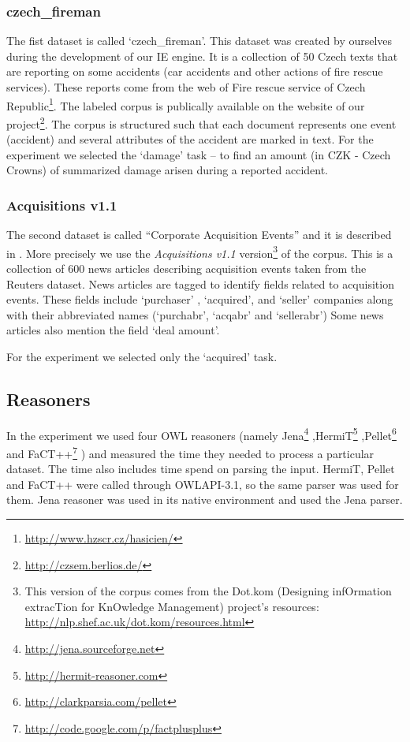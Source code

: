 \subsubsection{czech\_fireman}


The fist dataset is called `czech\_fireman'. This dataset was created by ourselves during the development of our IE  engine. It is a collection of 50 Czech texts that are reporting on some accidents (car accidents and other actions of fire rescue services). These reports come from the web of Fire rescue service of Czech Republic\footnote{\url{http://www.hzscr.cz/hasicien/}}. The labeled corpus is publically available on the website of our project\footnote{\url{http://czsem.berlios.de/}}.
The corpus is structured such that each document represents one event (accident) and several attributes of the accident are marked in text. For the experiment we selected the `damage' task -- to find an amount (in CZK - Czech Crowns) of summarized damage arisen during a reported accident.





\subsubsection{Acquisitions v1.1}  

The second dataset is called ``Corporate Acquisition Events'' and it is
described in \citep{lewis1992representation}. More precisely we use the \emph{Acquisitions v1.1} version\footnote{This version of the corpus comes from the Dot.kom (Designing infOrmation extracTion for KnOwledge Management) project's resources: \url{http://nlp.shef.ac.uk/dot.kom/resources.html}} of the corpus.
This is a collection of 600 news articles describing acquisition
events taken from the Reuters dataset. News articles are tagged to identify fields
related to acquisition events. These fields include `purchaser' , `acquired', and
`seller' companies along with their abbreviated names (`purchabr', `acqabr' and
`sellerabr') Some news articles also mention the field `deal amount'.


For the experiment we selected only the `acquired' task.





\subsection{Reasoners}

In the experiment we used four OWL reasoners (namely
Jena\footnote{\url{http://jena.sourceforge.net}}
,HermiT\footnote{\url{http://hermit-reasoner.com}}
,Pellet\footnote{\url{http://clarkparsia.com/pellet}}
and FaCT++\footnote{\url{http://code.google.com/p/factplusplus}}
) and measured the time they needed to process a particular dataset. The time also includes time spend on parsing the input. HermiT, Pellet and FaCT++ were called through OWLAPI-3.1, so the same parser was used for them. Jena reasoner was used in its native environment and used the Jena parser.

